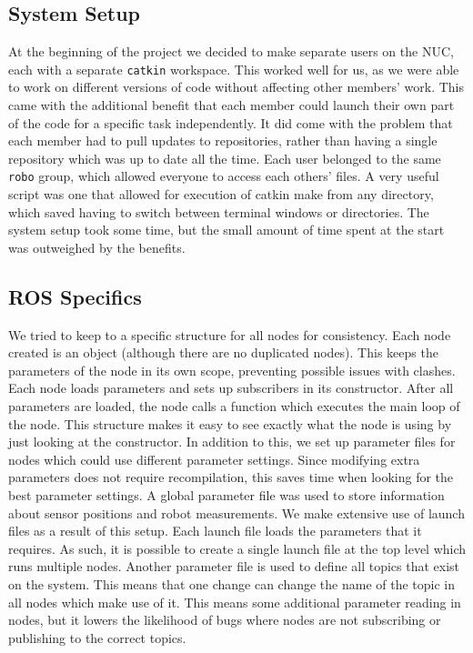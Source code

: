\subsection{System Setup}
At the beginning of the project we decided to make separate users on the NUC,
each with a separate \texttt{catkin} workspace. This worked well for us, as we
were able to work on different versions of code without affecting other members'
work. This came with the additional benefit that each member could launch their
own part of the code for a specific task independently. It did come with the
problem that each member had to pull updates to repositories, rather than having
a single repository which was up to date all the time. Each user belonged to the
same \texttt{robo} group, which allowed everyone to access each others' files. A
very useful script was one that allowed for execution of catkin make from any
directory, which saved having to switch between terminal windows or directories.
The system setup took some time, but the small amount of time spent at
the start was outweighed by the benefits.

\subsection{ROS Specifics}
We tried to keep to a specific structure for all nodes for consistency. Each
node created is an object (although there are no duplicated nodes). This keeps
the parameters of the node in its own scope, preventing possible issues with
clashes. Each node loads parameters and sets up subscribers in its constructor.
After all parameters are loaded, the node calls a function which executes the
main loop of the node. This structure makes it easy to see exactly what the node
is using by just looking at the constructor. In addition to this, we set up
parameter files for nodes which could use different parameter settings. Since
modifying extra parameters does not require recompilation, this saves time when
looking for the best parameter settings. A global parameter file was used to
store information about sensor positions and robot measurements. We make
extensive use of launch files as a result of this setup. Each launch file loads
the parameters that it requires. As such, it is possible to create a single
launch file at the top level which runs multiple nodes. Another parameter file
is used to define all topics that exist on the system. This means that one
change can change the name of the topic in all nodes which make use of it. This
means some additional parameter reading in nodes, but it lowers the likelihood
of bugs where nodes are not subscribing or publishing to the correct topics.

